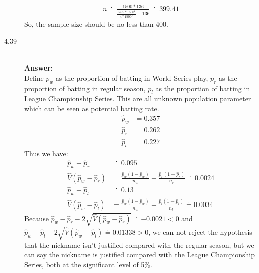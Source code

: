 \documentclass{article}
\begin{document}
\begin{description}
        \begin{align}
        n\doteq \frac{1500*136}{\frac{1499*1500^2}{4*1500^2}+136}\doteq 399.41
        \end{align}
        So, the sample size should be no less than 400.\\
    \item[4.39 ] \hfill \\
    {\bf Answer:}\\Define $p_w$ as the proportion of batting in World Series play, $p_r$ as the proportion of batting in regular season, $p_l$ as the proportion of batting in League Championship Series. This are all unknown population parameter which can be seen as potential batting rate.\\
    \begin{align}
    \hat{p}_w&=0.357\\
    \hat{p}_r&=0.262\\
    \hat{p}_l&=0.227
    \end{align}
    Thus we have:
    \begin{align}
      \hat{p}_w-\hat{p}_r&\doteq 0.095\\
      \hat{V}\left(\hat{p}_w-\hat{p}_r\right)&=\frac{\hat{p}_w\left(1-\hat{p}_w\right)}{n_w}+\frac{\hat{p}_r\left(1-\hat{p}_r\right)}{n_r}\doteq 0.0024\\
      \hat{p}_w-\hat{p}_l&\doteq 0.13\\
      \hat{V}\left(\hat{p}_w-\hat{p}_l\right)&=\frac{\hat{p}_w\left(1-\hat{p}_w\right)}{n_w}+\frac{\hat{p}_l\left(1-\hat{p}_l\right)}{n_l}\doteq 0.0034
    \end{align}
    Because $\hat{p}_w-\hat{p}_r-2\sqrt{\hat{V}\left(\hat{p}_w-\hat{p}_r\right)}\doteq -0.0021<0$ and $\hat{p}_w-\hat{p}_l-2\sqrt{\hat{V}\left(\hat{p}_w-\hat{p}_l\right)}\doteq 0.01338>0$, we can not reject the hypothesis that the nickname isn't justified compared with the regular season, but we can say the nickname is justified compared with the League Championship Series, both at the significant level of 5\%.
\end{description}
\end{document}
